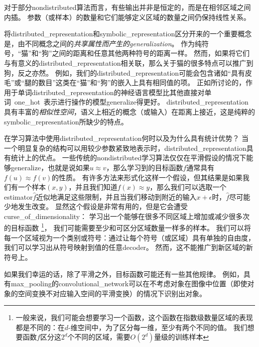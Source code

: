 


对于部分\gls{nondistributed}算法而言，有些输出并非是恒定的，而是在相邻区域之间内插。
参数（或样本）的数量和它们能够定义区域的数量之间仍保持线性关系。


将\gls{distributed_representation}和\gls{symbolic_representation}区分开来的一个重要概念是，由不同概念之间的\emph{共享属性而产生的\gls{generalization}}。
作为纯符号，``猫''和``狗''之间的距离和任意其他两种符号的距离一样。
然而，如果将它们与有意义的\gls{distributed_representation}相关联，那么关于猫的很多特点可以推广到狗，反之亦然。
例如，我们的\gls{distributed_representation}可能会包含诸如``具有皮毛''或``腿的数目''这类在``猫''和``狗''的嵌入上具有相同值的项。
正如所讨论的，作用于单词\gls{distributed_representation}的神经语言模型比其他直接对单词~\gls{one_hot}~表示进行操作的模型\gls{generalize}得更好。
\gls{distributed_representation}具有丰富的\emph{相似性空间}，语义上相近的概念（或输入）在距离上接近，这是纯粹的\gls{symbolic_representation}所缺少的特点。


在学习算法中使用\gls{distributed_representation}何时以及为什么具有统计优势？
当一个明显复杂的结构可以用较少参数紧致地表示时，\gls{distributed_representation}具有统计上的优点。
一些传统的\gls{nondistributed}学习算法仅仅在平滑假设的情况下能够\gls{generalize}，也就是说如果$u\approx v$，那么学习到的目标函数$f$通常具有$f(u) \approx f(v)$的性质。
有许多方法来形式化这样一个假设，但其结果是如果我们有一个样本$(x,y)$，并且我们知道$f(x) \approx y$，那么我们可以选取一个\gls{estimator}$\hat{f}$近似地满足这些限制，并且当我们移动到附近的输入$x + \epsilon$时，$\hat{f}$尽可能少地发生改变。
显然这个假设是非常有用的，但是它会遭受\gls{curse_of_dimensionality}：
学习出一个能够在很多不同区域上增加或减少很多次的目标函数
\footnote{一般来说，我们可能会想要学习一个函数，这个函数在指数级数量区域的表现都是不同的：在$d$-维空间中，为了区分每一维，至少有两个不同的值。
我们想要函数$f$区分这$2^d$个不同的区域，需要$O(2^d)$量级的训练样本}，
我们可能需要至少和可区分区域数量一样多的样本。
我们可以将每一个区域视为一个类别或符号：通过让每个符号（或区域）具有单独的自由度，我们可以学习出从符号映射到值的任意\gls{decoder}。
然而，这不能推广到新区域的新符号上。


如果我们幸运的话，除了平滑之外，目标函数可能还有一些其他规律。
例如，具有\gls{max_pooling}的\gls{convolutional_network}可以在不考虑对象在图像中位置（即使对象的空间变换不对应输入空间的平滑变换）的情况下识别出对象。

